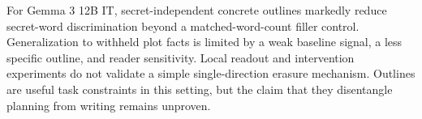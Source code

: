 For Gemma 3 12B IT, secret-independent concrete outlines markedly reduce secret-word discrimination beyond a matched-word-count filler control. Generalization to withheld plot facts is limited by a weak baseline signal, a less specific outline, and reader sensitivity. Local readout and intervention experiments do not validate a simple single-direction erasure mechanism. Outlines are useful task constraints in this setting, but the claim that they disentangle planning from writing remains unproven.
